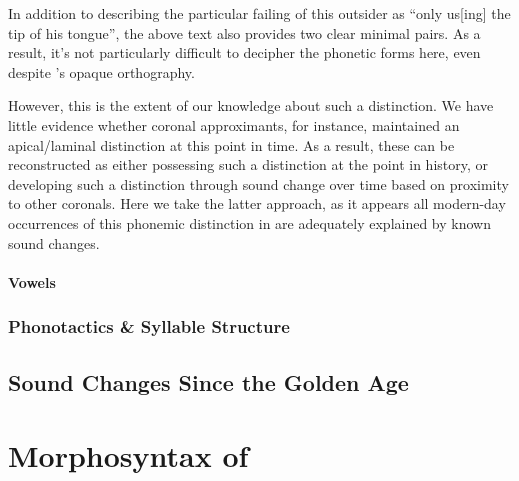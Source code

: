 In addition to describing the particular failing of this outsider as \enquote{only us[ing] the tip of his tongue}, the above text also provides two clear minimal pairs. As a result, it's not particularly difficult to decipher the phonetic forms here, even despite \oldlang{}'s opaque orthography. 

However, this is the extent of our knowledge about such a distinction. We have little evidence whether coronal approximants, for instance, maintained an apical/laminal distinction at this point in time. As a result, these can be reconstructed as either possessing such a distinction at the point in history, or developing such a distinction through sound change over time based on proximity to other coronals. Here we take the latter approach, as it appears all modern-day occurrences of this phonemic distinction in \lang{} are adequately explained by known sound changes.

\subsubsection{Vowels}

\subsection{Phonotactics \& Syllable Structure}

\section{Sound Changes Since the Golden Age}



\chapter[Morphosyntax][Morphosyntax of \oldlang{}]{Morphosyntax of \oldlang{}}